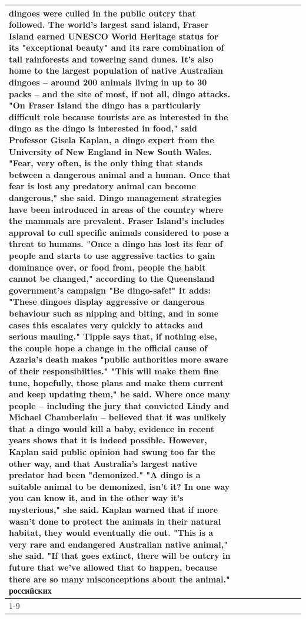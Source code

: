 \begin{table}[H]
\begin{tabular}{lllrlllll}
dingoes were culled in the public outcry that followed. The world's largest sand island, Fraser Island earned UNESCO World Heritage status for its "exceptional beauty" and its rare combination of tall rainforests and towering sand dunes. It's also home to the largest population of native Australian dingoes -- around 200 animals living in up to 30 packs -- and the site of most, if not all, dingo attacks. "On Fraser Island the dingo has a particularly difficult role because tourists are as interested in the dingo as the dingo is interested in food," said Professor Gisela Kaplan, a dingo expert from the University of New England in New South Wales. "Fear, very often, is the only thing that stands between a dangerous animal and a human. Once that fear is lost any predatory animal can become dangerous," she said. Dingo management strategies have been introduced in areas of the country where the mammals are prevalent. Fraser Island's includes approval to cull specific animals considered to pose a threat to humans. "Once a dingo has lost its fear of people and starts to use aggressive tactics to gain dominance over, or food from, people the habit cannot be changed," according to the Queensland government's campaign "Be dingo-safe!" It adds: "These dingoes display aggressive or dangerous behaviour such as nipping and biting, and in some cases this escalates very quickly to attacks and serious mauling." Tipple says that, if nothing else, the couple hope a change in the official cause of Azaria's death makes "public authorities more aware of their responsibilties." "This will make them fine tune, hopefully, those plans and make them current and keep updating them," he said. Where once many people -- including the jury that convicted Lindy and Michael Chamberlain -- believed that it was unlikely that a dingo would kill a baby, evidence in recent years shows that it is indeed possible. However, Kaplan said public opinion had swung too far the other way, and that Australia's largest native predator had been "demonized." "A dingo is a suitable animal to be demonized, isn't it? In one way you can know it, and in the other way it's mysterious," she said. Kaplan warned that if more wasn't done to protect the animals in their natural habitat, they would eventually die out. "This is a very rare and endangered Australian native animal," she said. "If that goes extinct, there will be outcry in future that we've allowed that to happen, because there are so many misconceptions about the animal." российских \\
\cline{1-9}

\end{tabular}
\end{table}
